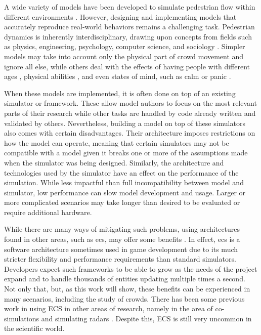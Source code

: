 \documentclass[twoside, 11pt]{article}
\begin{document}
A wide variety of models have been developed to simulate pedestrian flow within different environments \cite{kouskoulisSystematicReviewPedestrian2017}. However, designing and implementing models that accurately reproduce real-world behaviors remains a challenging task. Pedestrian dynamics is inherently interdisciplinary, drawing upon concepts from fields such as physics, engineering, psychology, computer science, and sociology \cite{kleinmeierVadereOpenSourceSimulation2019}. Simpler models may take into account only the physical part of crowd movement and ignore all else, while others deal with the effects of having people with different ages \cite{gorriniAgeGroupdrivenPedestrian2016}, physical abilities \cite{fuExperimentalStudyBidirectional2022}, and even states of mind, such as calm or panic \cite{Alrashed_Shamma_2020}.


When these models are implemented, it is often done on top of an existing simulator or framework. These allow model authors to focus on the most relevant parts of their research while other tasks are handled by code already written and validated by others. Nevertheless, building a model on top of these simulators also comes with certain disadvantages. Their architecture imposes restrictions on how the model can operate, meaning that certain simulators may not be compatible with a model given it breaks one or more of the assumptions made when the simulator was being designed. Similarly, the architecture and technologies used by the simulator have an effect on the performance of the simulation. While less impactful than full incompatibility between model and simulator, low performance can slow model development and usage. Larger or more complicated scenarios may take longer than desired to be evaluated or require additional hardware.

While there are many ways of mitigating such problems, using architectures found in other areas, such as \gls{ecs}, may offer some benefits \cite{ecs}. In effect, \gls{ecs} is a software architecture sometimes used in game development due to its much stricter flexibility and performance requirements than standard simulators. Developers expect such frameworks to be able to grow as the needs of the project expand and to handle thousands of entities updating multiple times a second. Not only that, but, as this work will show, these benefits can be experienced in many scenarios, including the study of crowds.  There has been some previous work in using ECS in other areas of research, namely in the area of co-simulations \cite{HATLEDAL2021102243} and simulating radars \cite{satelite}. Despite this, ECS is still very uncommon in the scientific world.
\end{document}
